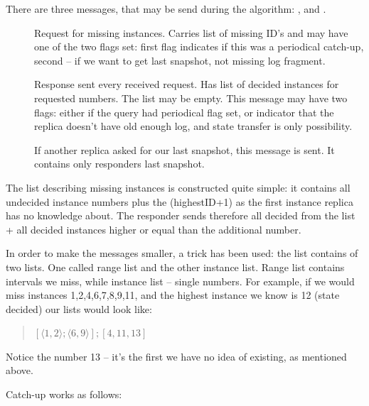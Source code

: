 There are three messages, that may be send during the algorithm: \catchUpQuery, \catchUpResponse and \catchUpSnapshot.
\begin{description}
 \item[\normalfont\catchUpQuery] Request for missing instances. Carries list of missing ID's and may have one of the two flags set: first flag indicates if this was a periodical catch-up, second -- if we want to get last snapshot, not missing log fragment.
 \item[\normalfont\catchUpResponse] Response sent every received request. Has list of decided instances for requested numbers. The list may be empty. This message may have two flags: either if the query had periodical flag set, or indicator that the replica doesn't have old enough log, and state transfer is only possibility.
 \item[\normalfont\catchUpSnapshot] If another replica asked for our last snapshot, this message is sent. It contains only responders last snapshot.
\end{description}

The list describing missing instances is constructed quite simple: it contains all undecided instance numbers plus the (highestID+1) as the first instance replica has no knowledge about. The responder sends therefore all decided from the list + all decided instances higher or equal than the additional number.

In order to make the messages smaller, a trick has been used: the list contains of two lists. One called range list and the other instance list.
Range list contains intervals we miss, while instance list -- single numbers. For example, if we would miss instances 1,2,4,6,7,8,9,11, and the highest instance we know is 12 (state decided) our lists would look like:
\begin{quote}
$[\langle1,2\rangle; \langle6,9\rangle]; [4,11,13]$
\end{quote} 
Notice the number 13 -- it's the first we have no idea of existing, as mentioned above.

Catch-up works as follows:

